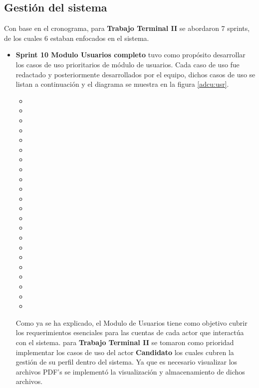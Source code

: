 \subsection{Gestión del sistema}
Con base en el cronograma, para \textbf{Trabajo Terminal II}  se abordaron 7 sprints, de los cuales 6 estaban enfocados en el sistema.
\begin{itemize}
    \item \textbf{Sprint 10 Modulo Usuarios completo} tuvo como propósito desarrollar los casos de uso prioritarios de módulo de usuarios.
    Cada caso de uso fue redactado y posteriormente desarrollados por el equipo, dichos casos de uso se listan a continuación y el diagrama se muestra en la figura \ref{adcu:usr}.
    \begin{itemize}
        \item {}
        \item {}
        \item {}
        \item {}
        \item {}
        \item {}
        \item {}
        \item {}
        \item {}
        \item {}
        \item {}
        \item {}
        \item {}
        \item {}
        \item {}
        \item {}
        \item {}
        \item {}
        \item {}
        \item {}
        \item {}
        \item {}
    \end{itemize} 

    Como ya se ha explicado, el Modulo de Usuarios tiene como objetivo cubrir los requerimientos esenciales para las cuentas de cada actor que interactúa con el sistema.
    para \textbf{Trabajo Terminal II} se tomaron como prioridad implementar los casos de uso del actor \textbf{Candidato} los cuales cubren la gestión de su perfil dentro del sistema.
    Ya que es necesario visualizar los archivos PDF's se implementó la visualización  y almacenamiento de dichos archivos.
    


\end{itemize}
